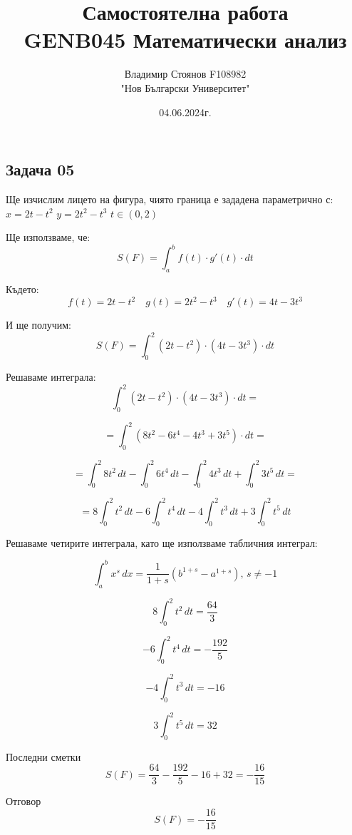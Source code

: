 \documentclass{article}
\title{\huge Самостоятелна работа \\ GENB045 Математически анализ}
\author{\LARGE Владимир Стоянов F108982 \\ \LARGE "Нов Български Университет"}
\date{\LARGE 04.06.2024г.}
\begin{document}
\maketitle

\Large
\begin{center}
    \section*{Задача 05}
\end{center}
\newpage
\begin{center}
    Ще изчислим лицето на фигура, чиято граница е зададена параметрично с: \\
    \vspace{0.5cm}
    $ x = 2t - t^2 $ \qquad
    $ y = 2t^2 - t^3 $ \qquad
    $ t \in (0, 2) $ \\
\end{center}

\vspace{1cm}
Ще използваме, че:
\[ S(F) = \int_a^b f(t) \cdot g'(t) \cdot dt \]

\vspace{1cm}
Където:
\[ f(t) = 2t-t^2 \quad g(t) = 2t^2-t^3 \quad g'(t) = 4t-3t^3 \]

\vspace{1cm}
И ще получим:
\[ S(F) = \int_0^2 (2t-t^2) \cdot (4t-3t^3) \cdot dt \]

\vspace{0.5cm}
Решаваме интеграла:
\[ \int_0^2 (2t-t^2) \cdot (4t-3t^3) \cdot dt = \]

\[ = \int_0^2 (8t^2 - 6t^4 - 4t^3 + 3t^5) \cdot dt = \]

\[ = {\int_0^2 8t^2\,dt} - {\int_0^2 6t^4\,dt} - {\int_0^2 4t^3\,dt} + {\int_0^2 3t^5\,dt} = \]

\[ = {8\int_0^2 t^2\,dt} - {6\int_0^2 t^4\,dt} - {4\int_0^2 t^3\,dt} + {3\int_0^2 t^5\,dt} \]
\newpage
\begin{flushleft}
    Решаваме четирите интеграла, като ще използваме табличния интеграл:
\end{flushleft}
\[ \int_a^b x^s\,dx = \frac{1}{1 + s}(b^{1+s} - a^{1 + s}),\, s \neq -1 \]

\[ 8\int_0^2 t^2\,dt = \frac{64}{3} \]

\[ -6\int_0^2 t^4\,dt = -\frac{192}{5} \]

\[ -4\int_0^2 t^3\,dt = -16 \]

\[ 3\int_0^2 t^5\,dt = 32 \]

\vspace{1cm}
Последни сметки
\[ S(F) = \frac{64}{3} - \frac{192}{5} - 16 + 32 = -\frac{16}{15} \]

\vspace{1.5cm}
\begin{center}
    Отговор
    \vspace{0.5cm}
    \[ S(F) = -\frac{16}{15} \]
\end{center}
\end{document}
